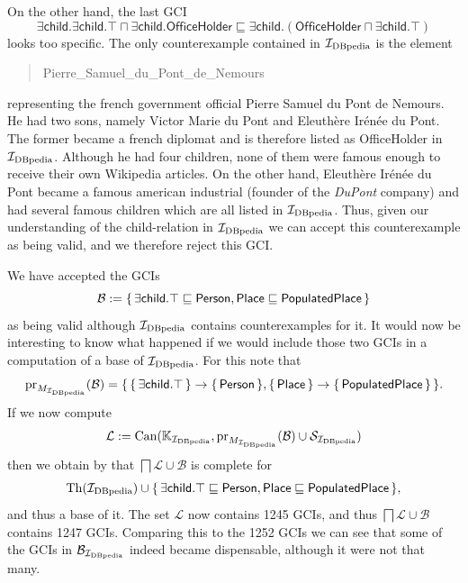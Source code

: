 On the other hand, the last GCI
\begin{equation*}
  \mathsf{\exists child. \exists child. \top \sqcap \exists child. OfficeHolder
    \sqsubseteq \exists child. ( OfficeHolder \sqcap \exists child. \top ) }
\end{equation*}
looks too specific.  The only counterexample contained in ${\mathcal{I}_{\text{DBpedia}}}$ is the element
\begin{quote}
  \textsf{Pierre\_Samuel\_du\_Pont\_de\_Nemours}
\end{quote}
representing the french government official Pierre Samuel du Pont de Nemours.  He had two
sons, namely Victor Marie du Pont and Eleuthère Irénée du Pont.  The former became a
french diplomat and is therefore listed as \textsf{OfficeHolder} in ${\mathcal{I}_{\text{DBpedia}}}$.  Although
he had four children, none of them were famous enough to receive their own Wikipedia
articles.  On the other hand, Eleuthère Irénée du Pont became a famous american industrial
(founder of the \emph{DuPont} company) and had several famous children which are all
listed in ${\mathcal{I}_{\text{DBpedia}}}$.  Thus, given our understanding of the \textsf{child}-relation in
${\mathcal{I}_{\text{DBpedia}}}$ we can accept this counterexample as being valid, and we therefore reject this
GCI.

We have accepted the GCIs
\begin{equation*}
  \mathcal{B} := {\{\, \mathsf{\exists child. \top \sqsubseteq Person},
    \mathsf{Place \sqsubseteq PopulatedPlace} \,\}}
\end{equation*}
as being valid although ${\mathcal{I}_{\text{DBpedia}}}$ contains counterexamples for it.  It would now be
interesting to know what happened if we would include those two GCIs in a computation of a
base of ${\mathcal{I}_{\text{DBpedia}}}$.  For this note that
\begin{equation*}
  \operatorname{pr}_{M_{{\mathcal{I}_{\text{DBpedia}}}}}(\mathcal{B}) = {\{\, {\{\, \mathsf{\exists child. \top} \,\}} \to {\ensuremath{\{\,
      \mathsf{Person} \,\}}}, {\{\, \mathsf{Place} \,\}} \to {\ensuremath{\{\, \mathsf{PopulatedPlace} \,\}}} \,\}}.
\end{equation*}
If we now compute
\begin{equation*}
  \mathcal{L} := \operatorname{Can}({\mathbb{K}}_{\mathcal{I}_{\text{DBpedia}}}, \operatorname{pr}_{M_{{\mathcal{I}_{\text{DBpedia}}}}}(\mathcal{B}) \cup
  \mathcal{S}_{{\mathcal{I}_{\text{DBpedia}}}} )
\end{equation*}
then we obtain by  that $\bigsqcap \mathcal{L}
\cup \mathcal{B}$ is complete for
\begin{equation*}
  \operatorname{Th}({\mathcal{I}_{\text{DBpedia}}}) \cup {\ensuremath{\{\, \mathsf{\exists child. \top \sqsubseteq Person },
    \mathsf{Place \sqsubseteq PopulatedPlace} \,\}}},
\end{equation*}
and thus a base of it.  The set $\mathcal{L}$ now contains 1245 GCIs, and thus $\bigsqcap
\mathcal{L} \cup \mathcal{B}$ contains 1247 GCIs.  Comparing this to the 1252 GCIs we can
see that some of the GCIs in $\mathcal{B}_{\mathcal{I}_{\text{DBpedia}}}$ indeed became dispensable, although
it were not that many.

